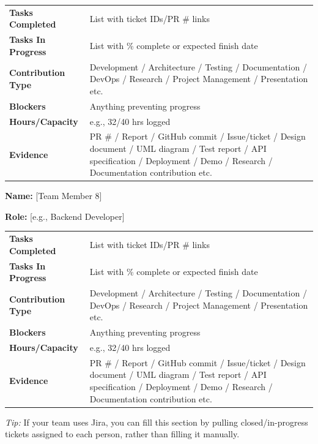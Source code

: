 \documentclass[11pt,a4paper]{article}
\newcommand{\field}[2]{\textbf{#1:} #2\par}
\begin{document}
\vspace{4pt}

\begin{tabular}{>{\bfseries}p{} p{}}
\toprule
Tasks Completed & List with ticket IDs/PR \# links \\
Tasks In Progress & List with \% complete or expected finish date \\
Contribution Type & Development / Architecture / Testing / Documentation / DevOps / Research / Project Management / Presentation etc.\\
Blockers & Anything preventing progress \\
Hours/Capacity & e.g., 32/40 hrs logged \\
Evidence & PR \# / Report / GitHub commit / Issue/ticket / Design document / UML diagram / Test report / API specification / Deployment / Demo / Research / Documentation contribution etc.\\
\bottomrule
\end{tabular}

\vspace{10pt}

\field{Name}{[Team Member 8]}
\field{Role}{[e.g., Backend Developer]}

\vspace{4pt}

\begin{tabular}{>{\bfseries}p{} p{}}
\toprule
Tasks Completed & List with ticket IDs/PR \# links \\
Tasks In Progress & List with \% complete or expected finish date \\
Contribution Type & Development / Architecture / Testing / Documentation / DevOps / Research / Project Management / Presentation etc.\\
Blockers & Anything preventing progress \\
Hours/Capacity & e.g., 32/40 hrs logged \\
Evidence & PR \# / Report / GitHub commit / Issue/ticket / Design document / UML diagram / Test report / API specification / Deployment / Demo / Research / Documentation contribution etc.\\
\bottomrule
\end{tabular}

\vspace{6pt}
\noindent
\textit{Tip:} If your team uses Jira, you can fill this section by pulling closed/in-progress tickets assigned to each person, rather than filling it manually.
\end{document}
